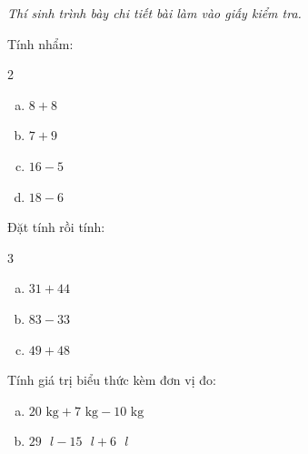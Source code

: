{\itshape Thí sinh trình bày chi tiết bài làm vào giấy kiểm tra.}

\begin{bt}[1,0 điểm]
Tính nhẩm:
\begin{multicols}{2}
\begin{enumerate}[a)]
  \item $8 + 8$
  \item $7 + 9$
  \item $16 - 5$
  \item $18 - 6$
\end{enumerate}
\end{multicols}
\end{bt}

\begin{bt}[1,5 điểm]
Đặt tính rồi tính:
\begin{multicols}{3}
\begin{enumerate}[a)]
  \item $31 + 44$
  \item $83 - 33$
  \item $49 + 48$
\end{enumerate}
\end{multicols}
\end{bt}

\begin{bt}[1,0 điểm]
Tính giá trị biểu thức kèm đơn vị đo:
\begin{enumerate}[a)]
  \item $20\text{ kg} + 7\text{ kg} - 10\text{ kg}$
  \item $29\text{ }l - 15\text{ }l + 6\text{ }l$
\end{enumerate}
\end{bt}

